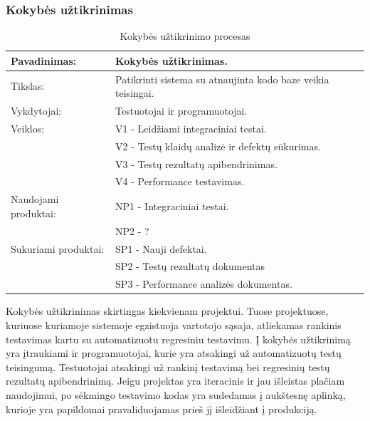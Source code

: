 \documentclass{VUMIFPSkursinis}
\begin{document}
	\subsubsection{Kokybės užtikrinimas}
	\begin{center}
		\begin{table}[ht]
		\caption{Kokybės užtikrinimo procesas}
		\begin{tabular}{ | l | l | } 
		\hline
		Pavadinimas:         & Kokybės užtikrinimas.                                       \\ \hline
		Tikslas: 	           & Patikrinti sistema su atnaujinta kodo baze veikia teisingai. \\ \hline
		Vykdytojai:          & Testuotojai ir programuotojai.                                \\ \hline
		Veiklos:             & V1 - Leidžiami integraciniai testai. 													\\
						             & V2 - Testų klaidų analizė ir defektų sūkurimas. 								 \\
					 	             & V3 - Testų rezultatų apibendrinimas. 														\\ 
						    				 & V4 - Performance testavimas. 																		 \\ \hline
		Naudojami produktai: & NP1 - Integraciniai testai. 																				\\
												 & NP2 - ?																													 \\ \hline
		Sukuriami produktai: & SP1 - Nauji defektai. 																								\\
												 & SP2 - Testų rezultatų dokumentas 																	 \\
												 & SP3 - Performance analizės dokumentas. 															\\ \hline
		\end{tabular}
	\end{table}
		\end{center}
	Kokybės užtikrinimas skirtingas kiekvienam projektui. Tuose projektuose, kuriuose kuriamoje sistemoje egzistuoja vartotojo sąsaja, atliekamas rankinis testavimas kartu su automatizuotu regresiniu testavimu. Į kokybės užtikrinimą yra įtraukiami ir programuotojai, kurie yra atsakingi už automatizuotų testų teisingumą. Testuotojai atsakingi už rankinį testavimą bei regresinių testų rezultatų apibendrinimą. Jeigu projektas yra iteracinis ir jau išleistas plačiam naudojimui, po sėkmingo testavimo kodas yra sudedamas į aukštesnę aplinką, kurioje yra papildomai pravaliduojamas prieš jį išleidžiant į produkciją.
\end{document}
